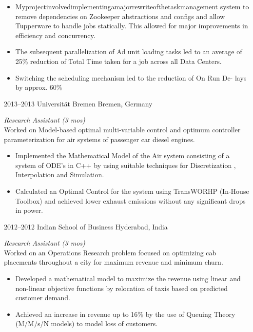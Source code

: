 \documentclass[print]{friggeri-cv} %
\begin{document}
\begin{entrylist}
{\begin{itemize}
\item Myprojectinvolvedimplementingamajorrewriteofthetaskmanagement system to remove dependencies on Zookeeper abstractions and configs and allow Tupperware to handle jobs statically. This allowed for major improvements in efficiency and concurrency.
\item The subsequent parallelization of Ad unit loading tasks led to an average of 25\% reduction of Total Time taken for a job across all Data Centers.
\item Switching the scheduling mechanism led to the reduction of On Run De-
lays by approx. 60\%
\end{itemize}}

\end{entrylist}
\begin{entrylist}
\entry
{2013--2013}
{Universität Bremen}
{Bremen, Germany}
{\emph{Research Assistant (3 mos)} \\
Worked on Model-based optimal multi-variable control and optimum controller parameterization for air systems of passenger car diesel engines.

\begin{itemize}
\item Implemented the Mathematical Model of the Air system consisting of a system of ODE’s in C++ by using suitable techniques for Discretization , Interpolation and Simulation.
\item Calculated an Optimal Control for the system using TransWORHP (In-House Toolbox) and achieved lower exhaust emissions without any significant drops in power.
\end{itemize}}

\entry
{2012--2012}
{Indian School of Business}
{Hyderabad, India}
{\emph{Research Assistant (3 mos)} \\
Worked on an Operations Research problem focused on optimizing cab placements throughout a city for maximum revenue and minimum churn.

\begin{itemize}
\item Developed a mathematical model to maximize the revenue using linear and non-linear objective functions by relocation of taxis based on predicted customer demand.
\item Achieved an increase in revenue up to 16\% by the use of Queuing Theory (M/M/s/N models) to model loss of customers.
\end{itemize}}

\end{entrylist}
\end{document}
